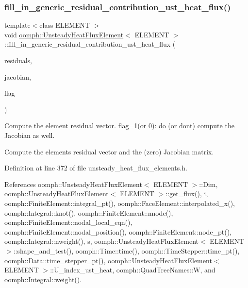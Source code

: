 \subsubsection{\texorpdfstring{fill\+\_\+in\+\_\+generic\+\_\+residual\+\_\+contribution\+\_\+ust\+\_\+heat\+\_\+flux()}{fill\_in\_generic\_residual\_contribution\_ust\_heat\_flux()}}
{\footnotesize\ttfamily template$<$class E\+L\+E\+M\+E\+NT $>$ \\
void \hyperlink{classoomph_1_1UnsteadyHeatFluxElement}{oomph\+::\+Unsteady\+Heat\+Flux\+Element}$<$ E\+L\+E\+M\+E\+NT $>$\+::fill\+\_\+in\+\_\+generic\+\_\+residual\+\_\+contribution\+\_\+ust\+\_\+heat\+\_\+flux (\begin{DoxyParamCaption}\item[{\hyperlink{classoomph_1_1Vector}{Vector}$<$ double $>$ \&}]{residuals,  }\item[{\hyperlink{classoomph_1_1DenseMatrix}{Dense\+Matrix}$<$ double $>$ \&}]{jacobian,  }\item[{unsigned}]{flag }\end{DoxyParamCaption})\hspace{0.3cm}{\ttfamily [private]}}



Compute the element residual vector. flag=1(or 0)\+: do (or don\textquotesingle{}t) compute the Jacobian as well. 

Compute the element\textquotesingle{}s residual vector and the (zero) Jacobian matrix. 

Definition at line 372 of file unsteady\+\_\+heat\+\_\+flux\+\_\+elements.\+h.



References oomph\+::\+Unsteady\+Heat\+Flux\+Element$<$ E\+L\+E\+M\+E\+N\+T $>$\+::\+Dim, oomph\+::\+Unsteady\+Heat\+Flux\+Element$<$ E\+L\+E\+M\+E\+N\+T $>$\+::get\+\_\+flux(), i, oomph\+::\+Finite\+Element\+::integral\+\_\+pt(), oomph\+::\+Face\+Element\+::interpolated\+\_\+x(), oomph\+::\+Integral\+::knot(), oomph\+::\+Finite\+Element\+::nnode(), oomph\+::\+Finite\+Element\+::nodal\+\_\+local\+\_\+eqn(), oomph\+::\+Finite\+Element\+::nodal\+\_\+position(), oomph\+::\+Finite\+Element\+::node\+\_\+pt(), oomph\+::\+Integral\+::nweight(), s, oomph\+::\+Unsteady\+Heat\+Flux\+Element$<$ E\+L\+E\+M\+E\+N\+T $>$\+::shape\+\_\+and\+\_\+test(), oomph\+::\+Time\+::time(), oomph\+::\+Time\+Stepper\+::time\+\_\+pt(), oomph\+::\+Data\+::time\+\_\+stepper\+\_\+pt(), oomph\+::\+Unsteady\+Heat\+Flux\+Element$<$ E\+L\+E\+M\+E\+N\+T $>$\+::\+U\+\_\+index\+\_\+ust\+\_\+heat, oomph\+::\+Quad\+Tree\+Names\+::W, and oomph\+::\+Integral\+::weight().



